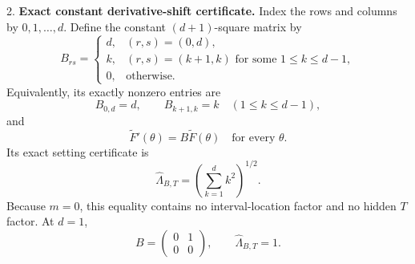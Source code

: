 \begin{proposition}
2. \textbf{Exact constant derivative-shift certificate.} Index the rows and
   columns by \(0,1,\ldots,d\). Define the constant \((d+1)\)-square matrix by
\begin{equation}
\label{eq:appendix-indented-011}
   B_{rs}=
   \begin{cases}
   d,&(r,s)=(0,d),\\
   k,&(r,s)=(k+1,k)\text{ for some }1\leq k\leq d-1,\\
   0,&\text{otherwise}.
   \end{cases}
\end{equation}
   Equivalently, its exactly nonzero entries are
\begin{equation}
\label{eq:appendix-indented-012}
   B_{0,d}=d,\qquad
   B_{k+1,k}=k\quad(1\leq k\leq d-1),
\end{equation}
   and
\begin{equation}
\label{eq:appendix-indented-013}
   \widetilde F'(\theta)=B\widetilde F(\theta)
   \quad\text{for every }\theta.
\end{equation}
   Its exact setting certificate is
\begin{equation}
\label{eq:appendix-indented-014}
   \widehat\Lambda_{B,T}
   =\left(\sum_{k=1}^{d}k^2\right)^{1/2}.
\end{equation}
   Because \(m=0\), this equality contains no interval-location factor and no hidden \(T\) factor. At \(d=1\),
\begin{equation}
\label{eq:appendix-indented-015}
   B=\begin{pmatrix}0&1\\0&0\end{pmatrix},
   \qquad
   \widehat\Lambda_{B,T}=1.
\end{equation}


\end{proposition}
